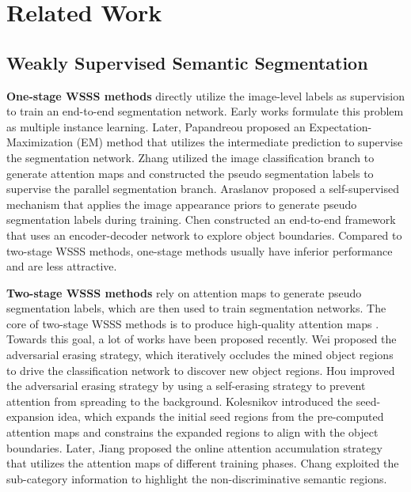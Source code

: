 \documentclass[10pt,twocolumn,letterpaper]{article}
\newcommand{\myParaP}[1]{\vspace{.05in}\noindent\textbf{#1}}
\begin{document}
\section{Related Work}

\subsection{Weakly Supervised Semantic Segmentation}

\myParaP{One-stage WSSS methods} directly utilize the image-level labels 
as supervision to train an end-to-end segmentation network.
Early works \cite{pathak2014fully,pinheiro2015image} formulate this problem 
as multiple instance learning.
Later, Papandreou \etal \cite{papandreou2015weakly} proposed an 
Expectation-Maximization (EM) method that utilizes 
the intermediate prediction to supervise the segmentation network.
Zhang \etal \cite{zhang2020reliability} utilized the image 
classification branch to generate attention maps and constructed 
the pseudo segmentation labels to supervise the parallel segmentation branch.
Araslanov \etal \cite{araslanov2020single} proposed a self-supervised 
mechanism that applies the image appearance priors to generate pseudo 
segmentation labels during training.
Chen \etal \cite{chen2021end} constructed an end-to-end framework 
that uses an encoder-decoder network to explore object boundaries.
Compared to two-stage WSSS methods, one-stage methods usually 
have inferior performance and are 
less attractive.



\myParaP{Two-stage WSSS methods} rely on attention maps 
\cite{zhou2016learning,zhang2018adversarial} 
to generate pseudo segmentation labels, which are then used 
to train segmentation networks.
The core of two-stage WSSS methods is to produce high-quality attention maps
\cite{wei2018revisiting,chang2020mixup,wang2020self,sun2020mining,li2018tell}.
Towards this goal, a lot of works have been proposed recently.
Wei \etal \cite{wei2017object} proposed the adversarial erasing strategy, 
which iteratively occludes the mined object regions
to drive the classification network to discover new object regions. 
Hou \etal \cite{hou2018self} improved the adversarial erasing strategy 
by using a self-erasing strategy to prevent attention 
from spreading to the background.
Kolesnikov \etal \cite{kolesnikov2016seed} introduced the seed-expansion idea, 
which expands the initial seed regions from the pre-computed attention maps 
and constrains the expanded regions to align with the object boundaries.
Later, Jiang \etal \cite{jiang2019integral} proposed the online 
attention accumulation strategy that utilizes the attention maps 
of different training phases.
Chang \etal \cite{chang2020weakly} exploited the sub-category information 
to highlight the non-discriminative semantic regions.
\end{document}
